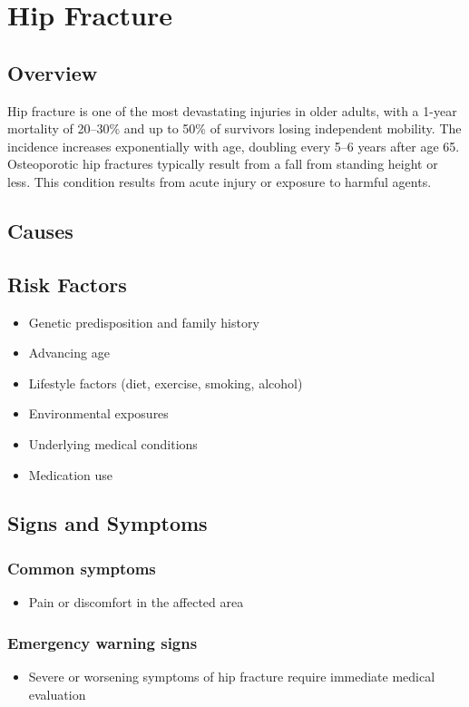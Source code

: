 \chapter{Hip Fracture}
\label{sec:Hip Fracture}

\section{Overview}
Hip fracture is one of the most devastating injuries in older adults, with a 1-year mortality of 20--30\% and up to 50\% of survivors losing independent mobility. The incidence increases exponentially with age, doubling every 5--6 years after age 65. Osteoporotic hip fractures typically result from a fall from standing height or less. This condition results from acute injury or exposure to harmful agents.
\section{Causes}
\section{Risk Factors}

\begin{itemize}[noitemsep]
  \item Genetic predisposition and family history
  \item Advancing age
  \item Lifestyle factors (diet, exercise, smoking, alcohol)
  \item Environmental exposures
  \item Underlying medical conditions
  \item Medication use
\end{itemize}
\section{Signs and Symptoms}

\subsection{Common symptoms}
\begin{itemize}[noitemsep]
  \item Pain or discomfort in the affected area
  \end{itemize}

\subsection{Emergency warning signs}
\begin{itemize}[noitemsep]
  \item Severe or worsening symptoms of hip fracture require immediate medical evaluation
\end{itemize}
